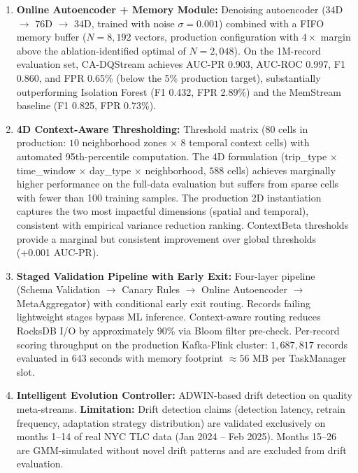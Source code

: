 \begin{enumerate}
    \item \textbf{Online Autoencoder + Memory Module:} Denoising autoencoder ($34$D $\rightarrow$ $76$D $\rightarrow$ $34$D, trained with noise $\sigma=0.001$) combined with a FIFO memory buffer ($N=8{,}192$ vectors, production configuration with $4\times$ margin above the ablation-identified optimal of $N=2{,}048$). On the 1M-record evaluation set, CA-DQStream achieves AUC-PR 0.903, AUC-ROC 0.997, F1 0.860, and FPR 0.65\% (below the 5\% production target), substantially outperforming Isolation Forest (F1 0.432, FPR 2.89\%) and the MemStream baseline (F1 0.825, FPR 0.73\%).

    \item \textbf{4D Context-Aware Thresholding:} Threshold matrix ($80$ cells in production: $10$ neighborhood zones $\times$ $8$ temporal context cells) with automated 95th-percentile computation. The 4D formulation (trip\_type $\times$ time\_window $\times$ day\_type $\times$ neighborhood, $588$ cells) achieves marginally higher performance on the full-data evaluation but suffers from sparse cells with fewer than 100 training samples. The production 2D instantiation captures the two most impactful dimensions (spatial and temporal), consistent with empirical variance reduction ranking. ContextBeta thresholds provide a marginal but consistent improvement over global thresholds (+0.001 AUC-PR).

    \item \textbf{Staged Validation Pipeline with Early Exit:} Four-layer pipeline (Schema Validation $\rightarrow$ Canary Rules $\rightarrow$ Online Autoencoder $\rightarrow$ MetaAggregator) with conditional early exit routing. Records failing lightweight stages bypass ML inference. Context-aware routing reduces RocksDB I/O by approximately 90\% via Bloom filter pre-check. Per-record scoring throughput on the production Kafka-Flink cluster: $1{,}687{,}817$ records evaluated in $643$ seconds with memory footprint $\approx 56$ MB per TaskManager slot.

    \item \textbf{Intelligent Evolution Controller:} ADWIN-based drift detection on quality meta-streams. \textbf{Limitation:} Drift detection claims (detection latency, retrain frequency, adaptation strategy distribution) are validated exclusively on months 1--14 of real NYC TLC data (Jan 2024 -- Feb 2025). Months 15--26 are GMM-simulated without novel drift patterns and are excluded from drift evaluation.
\end{enumerate}

